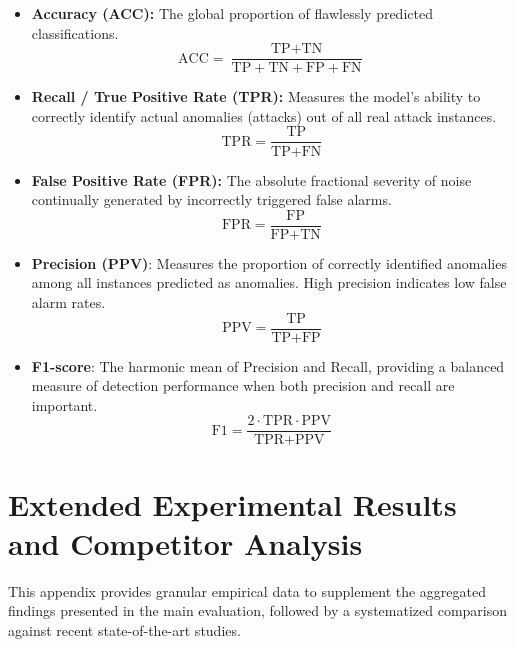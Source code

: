 \documentclass[final,twocolumn,10pt]{elsarticle}
\begin{document}
\begin{itemize}    
    \item \textbf{Accuracy (ACC):} The global proportion of flawlessly predicted classifications.
    \[ \text{ACC} = \frac{\text{TP} + \text{TN}}{\text{TP} + \text{TN} + \text{FP} + \text{FN}} \]
    
    \item \textbf{Recall / True Positive Rate (TPR):} Measures the model's ability to correctly identify actual anomalies (attacks) out of all real attack instances.
    \[ \text{TPR} = \frac{\text{TP}}{\text{TP} + \text{FN}} \]
    
    \item \textbf{False Positive Rate (FPR):} The absolute fractional severity of noise continually generated by incorrectly triggered false alarms.
    \[ \text{FPR} = \frac{\text{FP}}{\text{FP} + \text{TN}} \]
    
    \item \textbf{Precision (PPV)}: Measures the proportion of correctly identified anomalies among all instances predicted as anomalies. High precision indicates low false alarm rates.
    \[ \text{PPV} = \frac{\text{TP}}{\text{TP} + \text{FP}} \]
    
    \item \textbf{F1-score}: The harmonic mean of Precision and Recall, providing a balanced measure of detection performance when both precision and recall are important.
    \[ \text{F1} = \frac{2 \cdot \text{TPR} \cdot \text{PPV}}{\text{TPR} + \text{PPV}} \]
\end{itemize}


\section{Extended Experimental Results and Competitor Analysis}
\label{ap2:experiments}

This appendix provides granular empirical data to supplement the aggregated findings presented in the main evaluation, followed by a systematized comparison against recent state-of-the-art studies.
\end{document}
